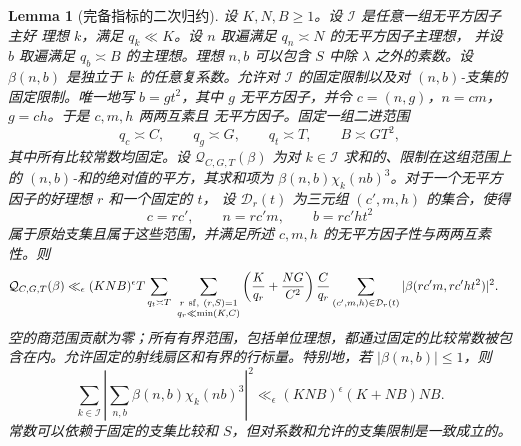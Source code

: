 \documentclass[11pt,a4paper]{article}
\numberwithin{equation}{section}
\numberwithin{figure}{section}
\newtheorem{lemma}[theorem]{Lemma}
\theoremstyle{definition}
\theoremstyle{remark}
\begin{document}
\begin{lemma}[完备指标的二次归约]
\label{lem:completed-quadratic-reduction}
设 $K,N,B\ge1$。设 $\mathcal I$ 是任意一组无平方因子主好
理想 $k$，满足 $q_k\ll K$。设 $n$ 取遍满足 $q_n\asymp N$ 的无平方因子主理想，
并设 $b$ 取遍满足 $q_b\asymp B$ 的主理想。理想 $n,b$ 可以包含 $S$ 中除
$\lambda$ 之外的素数。设 $\beta(n,b)$ 是独立于
$k$ 的任意复系数。允许对 $\mathcal I$ 的固定限制以及对
$(n,b)$-支集的固定限制。唯一地写 $b=gt^2$，其中 $g$ 无平方因子，并令
$c=(n,g)$，$n=cm$，$g=ch$。于是 $c,m,h$ 两两互素且
无平方因子。固定一组二进范围
\[
 q_c\asymp C,\qquad q_g\asymp G,\qquad q_t\asymp T,
 \qquad B\asymp GT^2,
\]
其中所有比较常数均固定。设 $\mathcal Q_{C,G,T}(\beta)$
为对 $k\in\mathcal I$ 求和的、限制在这组范围上的
$(n,b)$-和的绝对值的平方，其求和项为
$\beta(n,b)\chi_k(nb)^3$。对于一个无平方因子的好理想 $r$ 和一个固定的 $t$，
设 $\mathcal D_r(t)$ 为三元组 $(c',m,h)$ 的集合，使得
\[
 c=rc',\qquad n=rc'm,\qquad b=rc'ht^2
\]
属于原始支集且属于这些范围，并满足所述 $c,m,h$ 的无平方因子性与两两互素性。则
\begin{equation}\label{eq:completed-quadratic-reduction}
 \begin{split}
 \mathcal Q_{C,G,T}(\beta)
 \ll_\epsilon{}&(KNB)^\epsilon T
 \sum_{q_t\asymp T}\ 
 \sum_{\substack{r\ {\rm sf},\ (r,S)=1\\q_r\ll\min(K,C)}}
 \left(\frac K{q_r}+\frac{NG}{C^2}\right)\frac C{q_r}
 \sum_{(c',m,h)\in\mathcal D_r(t)}
       |\beta(rc'm,rc'ht^2)|^2.
 \end{split}
\end{equation}
空的商范围贡献为零；所有有界范围，包括单位理想，都通过固定的比较常数被包含在内。允许固定的射线扇区和有界的行标量。特别地，若
$|\beta(n,b)|\le1$，则
\begin{equation}\label{eq:completed-quadratic-norm}
 \sum_{k\in\mathcal I}
 \left|\sum_{n,b}\beta(n,b)\chi_k(nb)^3\right|^2
 \ll_\epsilon (KNB)^\epsilon(K+NB)NB.
\end{equation}
常数可以依赖于固定的支集比较和 $S$，但对系数和允许的支集限制是一致成立的。
\end{lemma}
\end{document}
